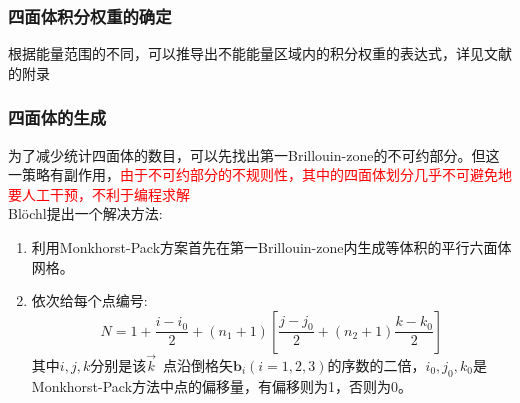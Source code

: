 {\frame
{
	\frametitle{四面体积分权重的确定}
\begin{figure}[h!]
\centering
{}
	\hfill
{}
\end{figure}
根据能量范围的不同，可以推导出不能能量区域内的积分权重的表达式，详见文献\cite{PRB49-16233_1994}的附录
}

\frame
{
	\frametitle{四面体的生成}
	为了减少统计四面体的数目，可以先找出第一\textrm{Brillouin-zone}的不可约部分。但这一策略有副作用，\textcolor{red}{由于不可约部分的不规则性，其中的四面体划分几乎不可避免地要人工干预，不利于编程求解}\\\textrm{Bl\"ochl}提出一个解决方法:\\
\begin{enumerate}
	\item 利用\textrm{Monkhorst-Pack}方案首先在第一\textrm{Brillouin-zone}内生成等体积的平行六面体网格。
	\item 依次给每个点编号:
\begin{displaymath}
	\boxed{N=1+\dfrac{i-i_0}2+(n_1+1)\left[\dfrac{j-j_0}2+(n_2+1)\dfrac{k-k_0}2\right]}
\end{displaymath}
其中$i,j,k$分别是该$\vec k$~点沿倒格矢$\mathbf{b}_i(i=1,2,3)$的序数的二倍，$i_0,j_0,k_0$是\textrm{Monkhorst-Pack}方法中点的偏移量，有偏移则为1，否则为0。
\end{enumerate}
}

}
